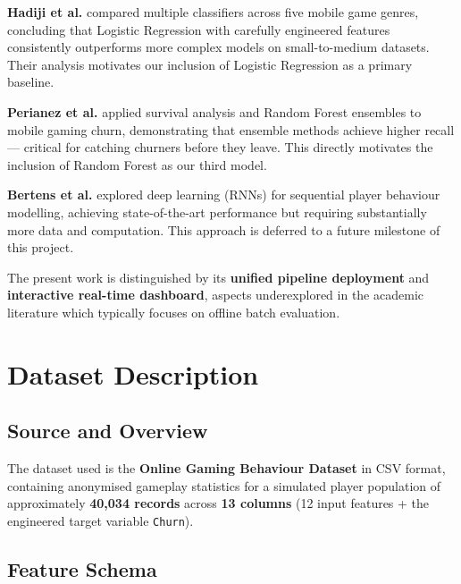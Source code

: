 \documentclass[12pt, a4paper]{article}
\begin{document}
\textbf{Hadiji et al.} \cite{hadiji2014} compared multiple classifiers
across five mobile game genres, concluding that Logistic Regression with
carefully engineered features consistently outperforms more complex models
on small-to-medium datasets. Their analysis motivates our inclusion of
Logistic Regression as a primary baseline.

\textbf{Perianez et al.} \cite{perianez2016} applied survival analysis
and Random Forest ensembles to mobile gaming churn, demonstrating that
ensemble methods achieve higher recall — critical for catching churners
before they leave. This directly motivates the inclusion of Random Forest
as our third model.

\textbf{Bertens et al.} \cite{bertens2017} explored deep learning (RNNs)
for sequential player behaviour modelling, achieving state-of-the-art
performance but requiring substantially more data and computation. This
approach is deferred to a future milestone of this project.

The present work is distinguished by its \textbf{unified pipeline deployment}
and \textbf{interactive real-time dashboard}, aspects underexplored in the
academic literature which typically focuses on offline batch evaluation.

\section{Dataset Description}

\subsection{Source and Overview}

The dataset used is the \textbf{Online Gaming Behaviour Dataset} in CSV
format, containing anonymised gameplay statistics for a simulated player
population of approximately \textbf{40,034 records} across \textbf{13 columns}
(12 input features + the engineered target variable \texttt{Churn}).

\subsection{Feature Schema}
\end{document}
